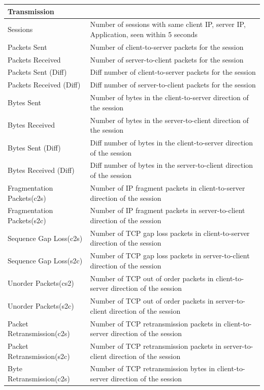 \begin{longtable}{p{}|p{}}
    \multicolumn{2}{l}{\textbf{Transmission}} \\\hline
    Sessions &	Number of sessions with same client IP, server IP, Application, seen within 5 seconds\\\hline
    Packets Sent &	Number of client-to-server packets for the session\\\hline
    Packets Received &	Number of server-to-client packets for the session\\\hline
    Packets Sent (Diff)	& Diff number of client-to-server packets for the session\\\hline
    Packets Received (Diff)	& Diff number of server-to-client packets for the session\\\hline
    Bytes Sent &	Number of bytes in the client-to-server direction of the session\\\hline
    Bytes Received &	Number of bytes in the server-to-client direction of the session\\\hline
    Bytes Sent (Diff) &	Diff number of bytes in the client-to-server direction of the session\\\hline
    Bytes Received (Diff) &	Diff number of bytes in the server-to-client direction of the session\\\hline
    Fragmentation Packets(c2s) &	Number of IP fragment packets in client-to-server direction of the session\\\hline
    Fragmentation Packets(s2c) &	Number of IP fragment packets in server-to-client direction of the session\\\hline
    Sequence Gap Loss(c2s) &	Number of TCP gap loss packets in client-to-server direction of the session \\\hline
    Sequence Gap Loss(s2c) &	Number of TCP gap loss packets in server-to-client direction of the session \\\hline
    Unorder Packets(cs2) &	Number of TCP out of order packets in client-to-server direction of the session \\\hline
    Unorder Packets(s2c) &	Number of TCP out of order packets in server-to-client direction of the session \\\hline
    Packet Retransmission(c2s) &	Number of TCP retransmission packets in client-to-server direction of the session\\\hline
    Packet Retransmission(s2c) &	Number of TCP retransmission packets in server-to-client direction of the session\\\hline
    Byte Retransmission(c2s) &	Number of TCP retransmission bytes in client-to-server direction of the session \\\hline

\end{longtable}
